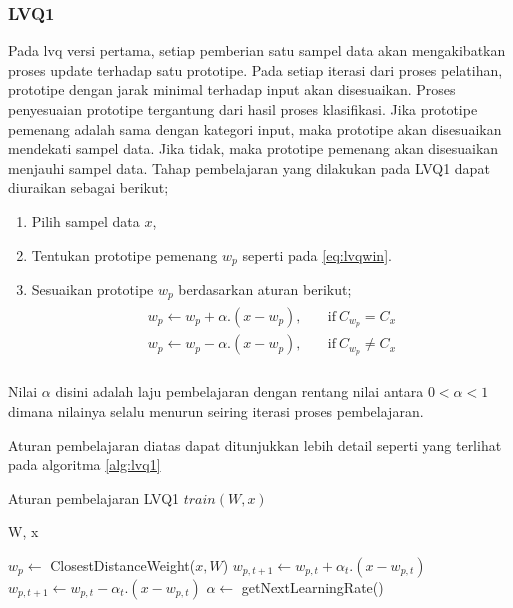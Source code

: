\subsubsection{LVQ1}
Pada \gls{lvq} versi pertama, setiap pemberian satu sampel data akan
mengakibatkan proses update terhadap satu prototipe. Pada setiap iterasi dari
proses pelatihan, prototipe dengan jarak minimal terhadap input
akan disesuaikan. Proses penyesuaian prototipe tergantung dari hasil proses
klasifikasi. Jika prototipe pemenang adalah sama dengan kategori input, maka
prototipe akan disesuaikan mendekati sampel data. Jika tidak, maka prototipe
pemenang akan disesuaikan menjauhi sampel data. Tahap pembelajaran yang
dilakukan pada LVQ1 dapat diuraikan sebagai berikut;
\begin{enumerate}
  \setlength{\itemsep}{1pt}
  \setlength{\parskip}{0pt}
  \setlength{\parsep}{0pt}
  \item Pilih sampel data $x$,
  \item Tentukan prototipe pemenang $w_p$ seperti pada \ref{eq:lvqwin}.
  \item Sesuaikan prototipe $w_p$ berdasarkan aturan berikut;
  \begin{align}
  \label{eq:lvq1}
  \begin{array}{ll}
  	w_p \leftarrow w_p + \alpha . (x - w_p), &\quad \text{if}\ C_{w_p} = C_x \\
  	w_p \leftarrow w_p - \alpha . (x - w_p), &\quad \text{if}\ C_{w_p} \neq C_x
  	\\
  \end{array}
  \end{align} 
\end{enumerate}

\noindent Nilai $\alpha$ disini adalah laju pembelajaran dengan rentang nilai
antara $0 < \alpha < 1$ dimana nilainya selalu menurun seiring iterasi proses
pembelajaran.

\noindent 
Aturan pembelajaran diatas dapat ditunjukkan lebih detail seperti
yang terlihat pada algoritma \ref{alg:lvq1}
\begin{algorithm}  
\caption{Aturan pembelajaran LVQ1 $train(W, x)$}          
\label{alg:lvq1}                           
\begin{algorithmic}                    %
	\REQUIRE W, x
	
	\STATE $w_p \leftarrow $ ClosestDistanceWeight($x, W$)
		\STATE $w_{p, t+1} \leftarrow w_{p,t} + \alpha_t . (x - w_{p,t})$
		\STATE $w_{p, t+1} \leftarrow w_{p,t} - \alpha_t . (x - w_{p,t})$
	\ENDIF	
	\STATE $\alpha \leftarrow $ getNextLearningRate()
\end{algorithmic}
\end{algorithm}

